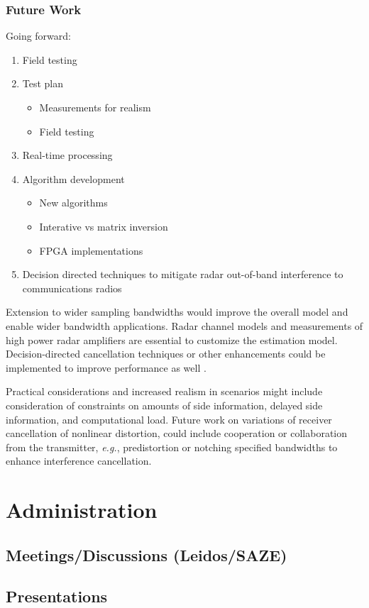 \documentclass[11pt,onecolumn]{IEEEtran}
\begin{document}
\subsubsection{Future Work}
Going forward:
\begin{enumerate}
\item Field testing 
\item Test plan
\begin{itemize}
\item Measurements for realism 
\item Field testing
\end{itemize}
\item Real-time processing
\item Algorithm development
\begin{itemize}
\item New algorithms
\item Interative vs matrix inversion
\item FPGA implementations
\end{itemize}
\item Decision directed techniques to mitigate radar out-of-band interference to communications radios
\end{enumerate}
Extension to wider sampling bandwidths would improve the overall model and enable wider bandwidth applications.  Radar channel models and measurements of high power radar amplifiers are essential to customize the estimation model.  Decision-directed cancellation techniques or other enhancements could be implemented to improve performance as well \cite{Gregorio}.  \par
Practical considerations and increased realism in scenarios might include consideration of constraints on amounts of side information, delayed side information, and computational load.  Future work on variations of receiver cancellation of nonlinear distortion, could include cooperation or collaboration from the transmitter, \emph{e.g.}, predistortion or notching specified bandwidths to enhance interference cancellation.

\section{Administration}
\subsection{Meetings/Discussions (Leidos/SAZE)}
\subsection{Presentations}
\end{document}
